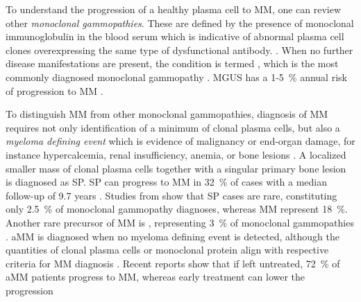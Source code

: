 To understand the progression of a healthy plasma cell to \ac{MM}, one can
review other \emph{monoclonal gammopathies}. These are defined by the presence
of monoclonal immunoglobulin in the blood serum which is indicative of abnormal
plasma cell clones overexpressing the same type of dysfunctional antibody.
\cite{kyleMonoclonalGammopathyUndetermined1997,
    fermandMonoclonalGammopathyClinical2018}. When no further disease manifestations
are present, the condition is termed , which is the most commonly
diagnosed monoclonal gammopathy \cite{kyleMonoclonalGammopathyUndetermined1997}.
\ac{MGUS} has a 1-\SI{5}{\percent} annual risk of progression to \ac{MM}
\cite{rajkumarInternationalMyelomaWorking2014}.

To distinguish \ac{MM} from other monoclonal gammopathies, diagnosis of \ac{MM}
requires not only identification of a minimum of clonal plasma cells, but also a
\emph{myeloma defining event} which is evidence of malignancy or end-organ
damage, for instance hypercalcemia, renal insufficiency, anemia, or bone lesions
\cite{rajkumarInternationalMyelomaWorking2014}. A localized
smaller mass of clonal plasma
cells together with a singular primary bone lesion is diagnosed as \ac{SP}.
\ac{SP} can progress to \ac{MM} in \SI{32}{\percent} of cases with a median
follow-up of 9.7 years
\cite{thumallapallySolitaryPlasmacytomaPopulationbased2017,
    gaoSolitaryBonePlasmacytoma2024}. Studies from
\citet{kyleMonoclonalGammopathyUndetermined1997} show that \ac{SP} cases are
rare, constituting only \SI{2.5}{\percent} of monoclonal gammopathy diagnoses,
whereas \ac{MM} represent \SI{18}{\percent}. Another rare precursor of \ac{MM}
is  , representing \SI{3}{\percent} of
monoclonal gammopathies \cite{kyleMonoclonalGammopathyUndetermined1997}.
\ac{aMM} is diagnosed when no myeloma defining event is detected, although the
quantities of clonal plasma cells or monoclonal protein align with respective
criteria for \ac{MM} diagnosis \cite{rajkumarInternationalMyelomaWorking2014}.
Recent reports show that if left untreated, \SI{72}{\percent} of \ac{aMM}
patients progress to \ac{MM}, whereas early treatment can lower the progression
